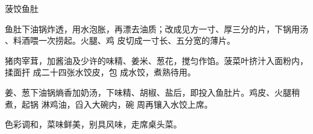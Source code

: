 \begin{recipe}{菠饺鱼肚}

\ingredients


\cooking

\step 鱼肚下油锅炸透，用水泡胀，再漂去油质；改成见方一寸、厚三分的片，下锅用汤
、料酒喂一次捞起。火腿、鸡 皮切成一寸长、五分宽的薄片。

猪肉宰茸，加酱油及少许的味精、姜米、葱花，搅匀作馅。菠菜叶挤汁入面粉内，揉面扞
成二十四张水饺皮，包 成水饺，煮熟待用。

姜、葱下油锅熵香加奶汤，下味精、胡椒、盐后，即投入鱼肚片。鸡皮、火腿稍煮，起锅
淋鸡油，舀入大碗内，碗 周再镶入水饺上席。

\features

色彩调和，菜味鲜美，别具风味，走席桌头菜。

\end{recipe}

